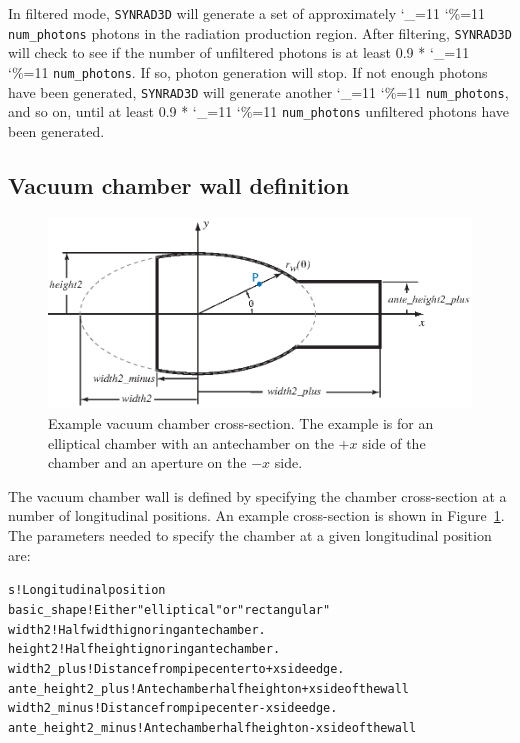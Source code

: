 \documentclass[11pt]{article}
\newcommand{\srthree}{\texttt{SYNRAD3D}\xspace}
\newcommand\ttcmd{\begingroup\catcode`\_=11 \catcode`\%=11 \dottcmd}
\newcommand\dottcmd[1]{\texttt{#1}\endgroup}
\newcommand{\fig}[1]{Figure~\ref{#1}}
\newcommand{\vn}{\ttcmd}
\newlength{\ExBeg}
\newlength{\ExEnd}
\newenvironment{example}
  {\vspace{\ExBeg} \begin{alltt}}
  {\end{alltt} \vspace{\ExEnd}}
\begin{document}
In filtered mode, \srthree will generate a set of approximately
\vn{num_photons} photons in the radiation production region.  After
filtering, \srthree will check to see if the number of unfiltered
photons is at least 0.9 * \vn{num_photons}. If so, photon generation
will stop. If not enough photons have been generated, \srthree will
generate another \vn{num_photons}, and so on, until at least 0.9 *
\vn{num_photons} unfiltered photons have been generated. 

\subsection{Vacuum chamber wall definition} 

\begin{figure}[tb]
\begin{center}
\includegraphics[width=5in]{chamber.eps}
\caption{Example vacuum chamber cross-section. The example is for an elliptical
chamber with an antechamber on the $+x$ side of the chamber and an
aperture on the $-x$ side.}
\label{f.chamber}
\end{center}
\end{figure}

The vacuum chamber wall is defined by specifying the chamber
cross-section at a number of longitudinal positions. An example
cross-section is shown in \fig{f.chamber}. The parameters needed to
specify the chamber at a given longitudinal position are:
\begin{example}
  s                   ! Longitudinal position
  basic_shape          ! Either "elliptical" or "rectangular"
  width2              ! Half width ignoring antechamber.
  height2             ! Half height ignoring antechamber.
  width2_plus         ! Distance from pipe center to +x side edge.
  ante_height2_plus   ! Antechamber half height on +x side of the wall
  width2_minus        ! Distance from pipe center -x side edge.
  ante_height2_minus  ! Antechamber half height on -x side of the wall
\end{example}
\end{document}
